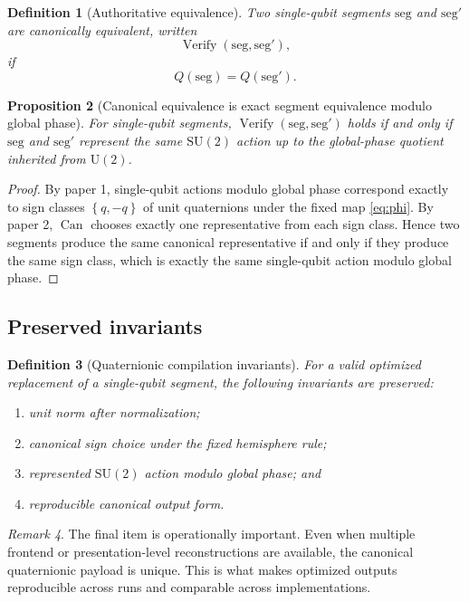 \documentclass[11pt]{article}
\newtheorem{definition}{Definition}[section]
\newtheorem{proposition}[definition]{Proposition}
\theoremstyle{remark}
\newtheorem{remark}[definition]{Remark}
\newcommand{\SU}{\mathrm{SU}}
\newcommand{\U}{\mathrm{U}}
\newcommand{\set}[1]{\left\{ #1 \right\}}
\newcommand{\canon}{\operatorname{Can}}
\newcommand{\Verify}{\operatorname{Verify}}
\begin{document}
\begin{definition}[Authoritative equivalence]
Two single-qubit segments $\mathrm{seg}$ and $\mathrm{seg}'$ are
\emph{canonically equivalent}, written
\[
\Verify(\mathrm{seg},\mathrm{seg}'),
\]
if
\[
Q(\mathrm{seg})=Q(\mathrm{seg}').
\]
\end{definition}

\begin{proposition}[Canonical equivalence is exact segment equivalence modulo global phase]
For single-qubit segments, $\Verify(\mathrm{seg},\mathrm{seg}')$ holds if and
only if $\mathrm{seg}$ and $\mathrm{seg}'$ represent the same $\SU(2)$ action
up to the global-phase quotient inherited from $\U(2)$.
\end{proposition}

\begin{proof}
By paper 1, single-qubit actions modulo global phase correspond exactly to sign
classes $\set{q,-q}$ of unit quaternions under the fixed map \eqref{eq:phi}. By
paper 2, $\canon$ chooses exactly one representative from each sign class. Hence
two segments produce the same canonical representative if and only if they
produce the same sign class, which is exactly the same single-qubit action modulo
global phase.
\end{proof}

\subsection{Preserved invariants}

\begin{definition}[Quaternionic compilation invariants]
For a valid optimized replacement of a single-qubit segment, the following
invariants are preserved:
\begin{enumerate}[label=(\alph*), leftmargin=1.5em]
\item unit norm after normalization;
\item canonical sign choice under the fixed hemisphere rule;
\item represented $\SU(2)$ action modulo global phase; and
\item reproducible canonical output form.
\end{enumerate}
\end{definition}

\begin{remark}
The final item is operationally important. Even when multiple frontend or
presentation-level reconstructions are available, the canonical quaternionic
payload is unique. This is what makes optimized outputs reproducible across runs
and comparable across implementations.
\end{remark}
\end{document}
